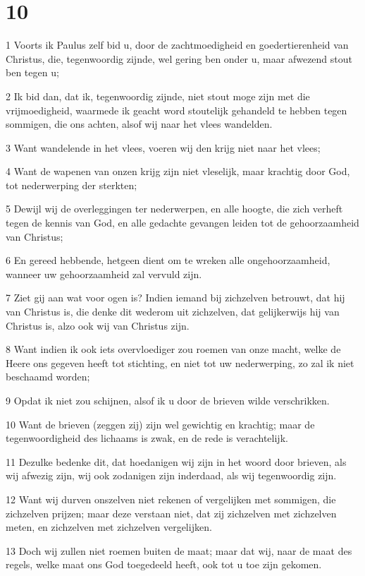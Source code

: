 \chapter{10}

\par 1 Voorts ik Paulus zelf bid u, door de zachtmoedigheid en goedertierenheid van Christus, die, tegenwoordig zijnde, wel gering ben onder u, maar afwezend stout ben tegen u;
\par 2 Ik bid dan, dat ik, tegenwoordig zijnde, niet stout moge zijn met die vrijmoedigheid, waarmede ik geacht word stoutelijk gehandeld te hebben tegen sommigen, die ons achten, alsof wij naar het vlees wandelden.
\par 3 Want wandelende in het vlees, voeren wij den krijg niet naar het vlees;
\par 4 Want de wapenen van onzen krijg zijn niet vleselijk, maar krachtig door God, tot nederwerping der sterkten;
\par 5 Dewijl wij de overleggingen ter nederwerpen, en alle hoogte, die zich verheft tegen de kennis van God, en alle gedachte gevangen leiden tot de gehoorzaamheid van Christus;
\par 6 En gereed hebbende, hetgeen dient om te wreken alle ongehoorzaamheid, wanneer uw gehoorzaamheid zal vervuld zijn.
\par 7 Ziet gij aan wat voor ogen is? Indien iemand bij zichzelven betrouwt, dat hij van Christus is, die denke dit wederom uit zichzelven, dat gelijkerwijs hij van Christus is, alzo ook wij van Christus zijn.
\par 8 Want indien ik ook iets overvloediger zou roemen van onze macht, welke de Heere ons gegeven heeft tot stichting, en niet tot uw nederwerping, zo zal ik niet beschaamd worden;
\par 9 Opdat ik niet zou schijnen, alsof ik u door de brieven wilde verschrikken.
\par 10 Want de brieven (zeggen zij) zijn wel gewichtig en krachtig; maar de tegenwoordigheid des lichaams is zwak, en de rede is verachtelijk.
\par 11 Dezulke bedenke dit, dat hoedanigen wij zijn in het woord door brieven, als wij afwezig zijn, wij ook zodanigen zijn inderdaad, als wij tegenwoordig zijn.
\par 12 Want wij durven onszelven niet rekenen of vergelijken met sommigen, die zichzelven prijzen; maar deze verstaan niet, dat zij zichzelven met zichzelven meten, en zichzelven met zichzelven vergelijken.
\par 13 Doch wij zullen niet roemen buiten de maat; maar dat wij, naar de maat des regels, welke maat ons God toegedeeld heeft, ook tot u toe zijn gekomen.
